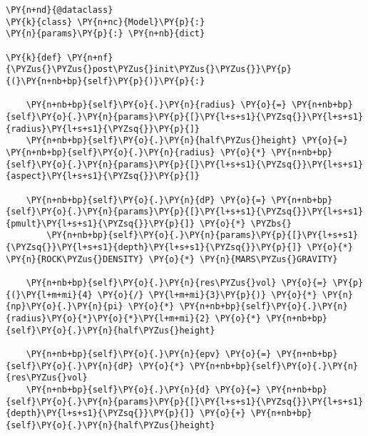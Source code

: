 \begin{tcolorbox}[breakable, size=fbox, boxrule=1pt, pad at break*=1mm,colback=cellbackground, colframe=cellborder]
\begin{Verbatim}[commandchars=\\\{\}]
\PY{n+nd}{@dataclass}
\PY{k}{class} \PY{n+nc}{Model}\PY{p}{:}
\PY{n}{params}\PY{p}{:} \PY{n+nb}{dict}

\PY{k}{def} \PY{n+nf}{\PYZus{}\PYZus{}post\PYZus{}init\PYZus{}\PYZus{}}\PY{p}{(}\PY{n+nb+bp}{self}\PY{p}{)}\PY{p}{:}

    \PY{n+nb+bp}{self}\PY{o}{.}\PY{n}{radius} \PY{o}{=} \PY{n+nb+bp}{self}\PY{o}{.}\PY{n}{params}\PY{p}{[}\PY{l+s+s1}{\PYZsq{}}\PY{l+s+s1}{radius}\PY{l+s+s1}{\PYZsq{}}\PY{p}{]}
    \PY{n+nb+bp}{self}\PY{o}{.}\PY{n}{half\PYZus{}height} \PY{o}{=} \PY{n+nb+bp}{self}\PY{o}{.}\PY{n}{radius} \PY{o}{*} \PY{n+nb+bp}{self}\PY{o}{.}\PY{n}{params}\PY{p}{[}\PY{l+s+s1}{\PYZsq{}}\PY{l+s+s1}{aspect}\PY{l+s+s1}{\PYZsq{}}\PY{p}{]}

    \PY{n+nb+bp}{self}\PY{o}{.}\PY{n}{dP} \PY{o}{=} \PY{n+nb+bp}{self}\PY{o}{.}\PY{n}{params}\PY{p}{[}\PY{l+s+s1}{\PYZsq{}}\PY{l+s+s1}{pmult}\PY{l+s+s1}{\PYZsq{}}\PY{p}{]} \PY{o}{*} \PYZbs{}
        \PY{n+nb+bp}{self}\PY{o}{.}\PY{n}{params}\PY{p}{[}\PY{l+s+s1}{\PYZsq{}}\PY{l+s+s1}{depth}\PY{l+s+s1}{\PYZsq{}}\PY{p}{]} \PY{o}{*} \PY{n}{ROCK\PYZus{}DENSITY} \PY{o}{*} \PY{n}{MARS\PYZus{}GRAVITY}

    \PY{n+nb+bp}{self}\PY{o}{.}\PY{n}{res\PYZus{}vol} \PY{o}{=} \PY{p}{(}\PY{l+m+mi}{4} \PY{o}{/} \PY{l+m+mi}{3}\PY{p}{)} \PY{o}{*} \PY{n}{np}\PY{o}{.}\PY{n}{pi} \PY{o}{*} \PY{n+nb+bp}{self}\PY{o}{.}\PY{n}{radius}\PY{o}{*}\PY{o}{*}\PY{l+m+mi}{2} \PY{o}{*} \PY{n+nb+bp}{self}\PY{o}{.}\PY{n}{half\PYZus{}height}

    \PY{n+nb+bp}{self}\PY{o}{.}\PY{n}{epv} \PY{o}{=} \PY{n+nb+bp}{self}\PY{o}{.}\PY{n}{dP} \PY{o}{*} \PY{n+nb+bp}{self}\PY{o}{.}\PY{n}{res\PYZus{}vol}
    \PY{n+nb+bp}{self}\PY{o}{.}\PY{n}{d} \PY{o}{=} \PY{n+nb+bp}{self}\PY{o}{.}\PY{n}{params}\PY{p}{[}\PY{l+s+s1}{\PYZsq{}}\PY{l+s+s1}{depth}\PY{l+s+s1}{\PYZsq{}}\PY{p}{]} \PY{o}{+} \PY{n+nb+bp}{self}\PY{o}{.}\PY{n}{half\PYZus{}height}


\end{Verbatim}
\end{tcolorbox}
